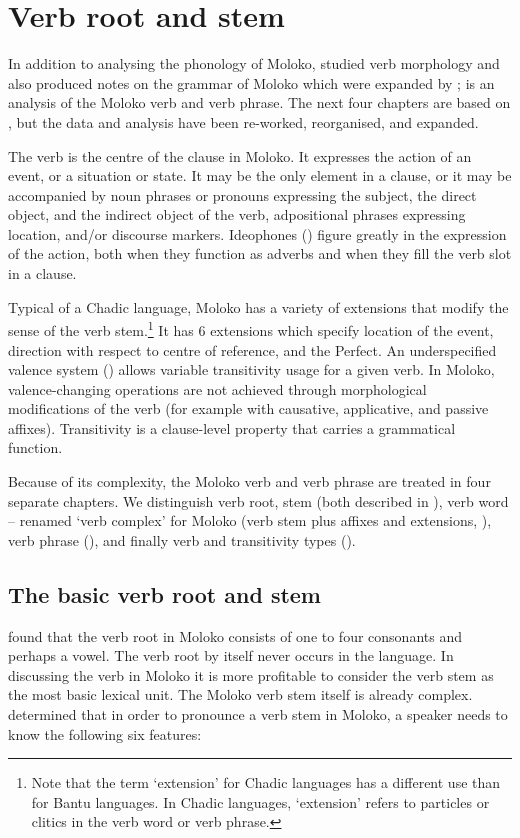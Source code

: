 \chapter[ Verb root and stem]{ Verb root and stem}\label{chap:6}
\hypertarget{RefHeading1211881525720847}{}
In addition to analysing the phonology of Moloko, \citet{Bow1997c} studied verb morphology and also produced notes on the grammar of Moloko which were expanded by \citet{Boyd2003}; \citet{FriesenMamalis2008} is an analysis of the Moloko verb and verb phrase. The next four chapters are based on \citet{FriesenMamalis2008}, but the data and analysis have been re-worked, reorganised, and expanded. 

The verb is the centre of the clause in Moloko.  It expresses the action of an event, or a situation or state.  It may be the only element in a clause, or it may be accompanied by noun phrases or pronouns expressing the subject, the direct object, and the indirect object of the verb, adpositional phrases expressing location, and/or discourse markers. Ideophones () figure greatly in the expression of the action, both when they function as adverbs and when they fill the verb slot in a clause.

Typical of a Chadic language, Moloko has a variety of extensions that modify the sense of the verb stem.\footnote{Note that the term ‘extension’ for Chadic languages has a different use than for Bantu languages. In Chadic languages, ‘extension’ refers to particles or clitics in the verb word or verb phrase.} It has 6 extensions which specify location of the event, direction with respect to centre of reference, and the Perfect.  An underspecified valence system () allows variable transitivity usage for a given verb. In Moloko, valence-changing operations are not achieved through morphological modifications of the verb (for example with causative, applicative, and passive affixes). Transitivity is a clause-level property that carries a grammatical function. 

Because of its complexity, the Moloko verb and verb phrase are treated in four separate chapters. We distinguish verb root, stem (both described in ), verb word -- renamed ‘verb complex’ for Moloko (verb stem plus affixes and extensions, ), verb phrase (), and finally verb and transitivity types (). 

\section{The basic verb root and stem}\label{sec:6.1}%
\hypertarget{RefHeading1211901525720847}{}
\citet{Bow1997c} found that the verb root in Moloko consists of one to four consonants and perhaps a vowel. The verb root by itself never occurs in the language. In discussing the verb in Moloko it is more profitable to consider the verb stem as the most basic lexical unit. The Moloko verb stem itself is already complex. \citet{FriesenMamalis2008} determined that in order to pronounce a verb stem in Moloko, a speaker needs to know the following six features: 


